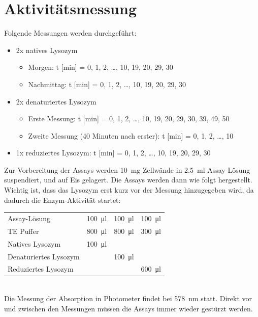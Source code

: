 \documentclass[a4paper,german]{scrreprt}
\begin{document}
\section{Aktivitätsmessung}

Folgende Messungen werden durchgeführt:
\begin{itemize}
	\item 2x natives Lysozym
		\begin{itemize}
			\item Morgen: t [min] = 0, 1, 2, \ldots, 10, 19, 20, 29, 30
			\item Nachmittag: t [min] = 0, 1, 2, \ldots, 10, 19, 20, 29, 30
		\end{itemize}
	\item 2x denaturiertes Lysozym
		\begin{itemize}
			\item Erste Messung: t [min] = 0, 1, 2, \ldots, 10, 19, 20, 29, 30, 39, 49, 50
			\item Zweite Messung (40 Minuten nach erster): t [min] = 0, 1, 2, \ldots, 10
		\end{itemize}
	\item 1x reduziertes Lysozym: t [min] = 0, 1, 2, \ldots, 10, 19, 20, 29, 30
\end{itemize}

Zur Vorbereitung der Assays werden \SI{10}{mg} Zellwände in \SI{2.5}{ml}
Assay-Lösung suspendiert, und auf Eis gelagert. Die Assays werden dann wie
folgt hergestellt. Wichtig ist, dass das Lysozym erst kurz vor der Messung
hinzugegeben wird, da dadurch die Enzym-Aktivität startet:
\\

\begin{tabular}{|l|l|l|l|}
	\hline
	Assay-Lösung          & \SI{100}{\ul} & \SI{100}{\ul} & \SI{100}{\ul} \\
	TE Puffer             & \SI{800}{\ul} & \SI{800}{\ul} & \SI{300}{\ul} \\
	Natives Lysozym       & \SI{100}{\ul} &               &               \\
	Denaturiertes Lysozym &               & \SI{100}{\ul} &               \\
	Reduziertes Lysozym   &               &               & \SI{600}{\ul} \\
	\hline
\end{tabular}
\\

Die Messung der Absorption in Photometer findet bei \SI{578}{nm} statt.  Direkt
vor und zwischen den Messungen müssen die Assays immer wieder gestürzt werden.
\end{document}
